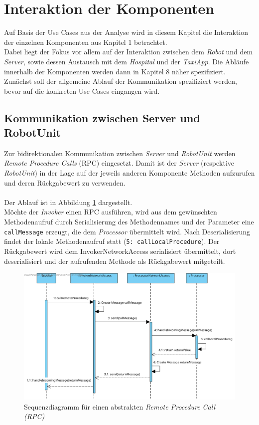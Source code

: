 \section{Interaktion der Komponenten}
Auf Basis der Use Cases aus der Analyse wird in diesem Kapitel die Interaktion der einzelnen Komponenten aus Kapitel 1 betrachtet. \\
Dabei liegt der Fokus vor allem auf der Interaktion zwischen dem \emph{Robot} und dem \emph{Server}, sowie dessen Austausch mit dem \emph{Hospital} und der \emph{TaxiApp}. 
Die Abläufe innerhalb der Komponenten werden dann in Kapitel 8 näher spezifiziert. \\
Zunächst soll der allgemeine Ablauf der Kommunikation spezifiziert werden, bevor auf die konkreten Use Cases eingangen wird.

\subsection*{Kommunikation zwischen Server und RobotUnit}
Zur bidirektionalen Kommunikation zwischen \emph{Server} und \emph{RobotUnit} werden \emph{Remote Procedure Calls} (RPC) eingesetzt. Damit ist der \emph{Server} (respektive \emph{RobotUnit}) in der Lage auf der jeweils anderen Komponente Methoden aufzurufen und deren Rückgabewert zu verwenden. \\ \\
Der Ablauf ist in Abbildung \ref{SequenzDiagrammRPC} dargestellt. \\ Möchte der \emph{Invoker} einen RPC ausführen, wird aus dem gewünschten Methodenaufruf durch Serialisierung des Methodennames und der Parameter eine \texttt{callMessage} erzeugt, die dem \emph{Processor} übermittelt wird. Nach Deserialisierung findet der lokale Methodenaufruf statt (\texttt{5: callLocalProcedure}). Der Rückgabewert wird dem InvokerNetworkAccess serialisiert übermittelt, dort deserialisiert und der aufrufenden Methode als Rückgabewert mitgeteilt.
\begin{figure}[H]
	\centering
	\includegraphics[width=1\textwidth]{img/2-Entwurf-Communication_RPC}
	\caption{Sequenzdiagramm für einen abstrakten \emph{Remote Procedure Call (RPC)}}
	\label{SequenzDiagrammRPC}
\end{figure}

